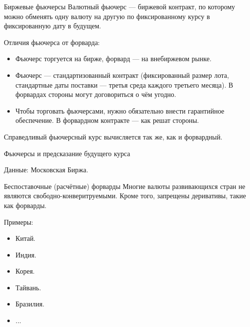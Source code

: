 \documentclass{beamer}
\begin{document}
\begin{frame}{Биржевые фьючерсы}
\justify
Валютный фьючерс --- биржевой контракт, по которому можно обменять одну валюту на другую по фиксированному курсу в фиксированную дату в будущем.

\justify
Отличия фьючерса от форварда:
\begin{itemize}
\justifying
\item Фьючерс торгуется на бирже, форвард --- на внебиржевом рынке.
\item Фьючерс --- стандартизованный контракт (фиксированный размер лота, стандартные даты поставки --- третья среда каждого третьего месяца). В форвардах стороны могут договориться о чём угодно.
\item Чтобы торговать фьючерсами, нужно обязательно внести гарантийное обеспечение. В форвардном контракте --- как решат стороны.
\end{itemize}

\justify
Справедливый фьючерсный курс вычисляется так же, как и форвардный.
\end{frame}



\begin{frame}{Фьючерсы и предсказание будущего курса}
\center
{}

\scriptsize Данные: Московская Биржа.
\end{frame}



\begin{frame}{Беспоставочные (расчётные) форварды}
\justify
Многие валюты развивающихся стран не являются свободно-конверитруемыми. Кроме того, запрещены деривативы, такие как форварды.

\justify
Примеры:
\begin{itemize}
\item Китай.
\item Индия.
\item Корея.
\item Тайвань.
\item Бразилия.
\item ...
\end{itemize}
\end{frame}
\end{document}
